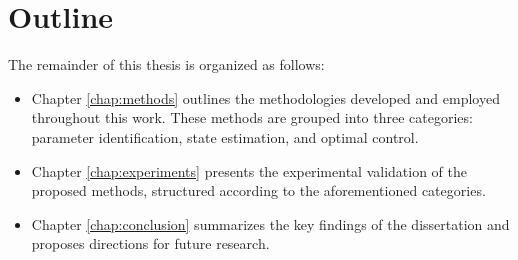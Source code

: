 \section{Outline} 
\label{sec:introduction:outline}

The remainder of this thesis is organized as follows:
\begin{itemize}
    \item Chapter \ref{chap:methods} outlines the methodologies developed and employed throughout this work. These methods are grouped into three categories: parameter identification, state estimation, and optimal control.
    \item Chapter \ref{chap:experiments} presents the experimental validation of the proposed methods, structured according to the aforementioned categories.
    \item Chapter \ref{chap:conclusion} summarizes the key findings of the dissertation and proposes directions for future research.
\end{itemize}
